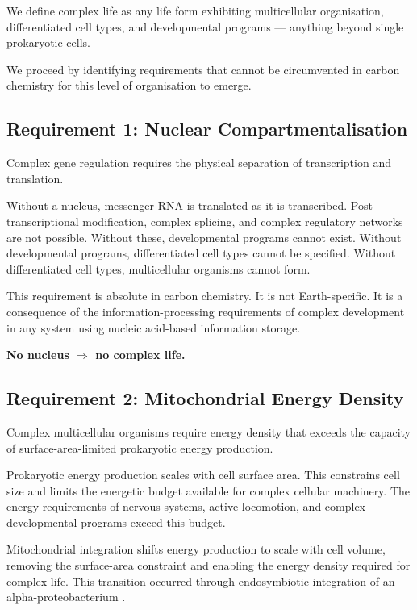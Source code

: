 \documentclass[11pt, a4paper]{article}
\begin{document}
We define complex life as any life form exhibiting
multicellular organisation, differentiated cell types,
and developmental programs --- anything beyond single
prokaryotic cells.

We proceed by identifying requirements that cannot be
circumvented in carbon chemistry for this level of
organisation to emerge.

\subsection{Requirement 1: Nuclear Compartmentalisation}

Complex gene regulation requires the physical separation
of transcription and translation.

Without a nucleus, messenger RNA is translated as it is
transcribed. Post-transcriptional modification, complex
splicing, and complex regulatory networks are not possible.
Without these, developmental programs cannot exist.
Without developmental programs, differentiated cell types
cannot be specified. Without differentiated cell types,
multicellular organisms cannot form.

This requirement is absolute in carbon chemistry.
It is not Earth-specific. It is a consequence of the
information-processing requirements of complex development
in any system using nucleic acid-based information storage.

\textbf{No nucleus $\Rightarrow$ no complex life.}

\subsection{Requirement 2: Mitochondrial Energy Density}

Complex multicellular organisms require energy density
that exceeds the capacity of surface-area-limited
prokaryotic energy production.

Prokaryotic energy production scales with cell surface
area. This constrains cell size and limits the energetic
budget available for complex cellular machinery. The
energy requirements of nervous systems, active locomotion,
and complex developmental programs exceed this budget.

Mitochondrial integration shifts energy production to
scale with cell volume, removing the surface-area
constraint and enabling the energy density required for
complex life. This transition occurred through
endosymbiotic integration of an alpha-proteobacterium
\cite{margulis1967}.
\end{document}
